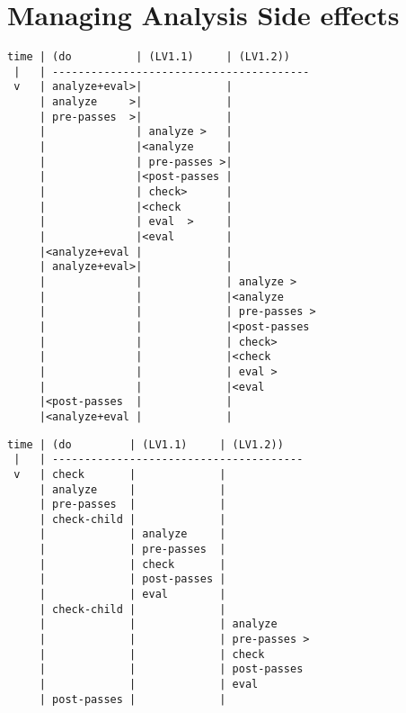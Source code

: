\chapter{Managing Analysis Side effects}

\begin{figure*}
\singlespacing
\begin{verbatim}
time | (do          | (LV1.1)     | (LV1.2))
 |   | ----------------------------------------
 v   | analyze+eval>|             |
     | analyze     >|             |
     | pre-passes  >|             |
     |              | analyze >   |
     |              |<analyze     |
     |              | pre-passes >|
     |              |<post-passes |
     |              | check>      |
     |              |<check       |
     |              | eval  >     |
     |              |<eval        |
     |<analyze+eval |             |
     | analyze+eval>|             |
     |              |             | analyze >   
     |              |             |<analyze     
     |              |             | pre-passes >
     |              |             |<post-passes 
     |              |             | check>      
     |              |             |<check       
     |              |             | eval >
     |              |             |<eval
     |<post-passes  |             |
     |<analyze+eval |             |
\end{verbatim}
  \caption{}
  \label{fig:analyzer:control-flow-pre-expand-side-effects}
\end{figure*}

\begin{figure*}
\singlespacing
\begin{verbatim}
time | (do         | (LV1.1)     | (LV1.2))
 |   | ---------------------------------------
 v   | check       |             |
     | analyze     |             |
     | pre-passes  |             |
     | check-child |             |
     |             | analyze     |
     |             | pre-passes  |
     |             | check       |
     |             | post-passes |
     |             | eval        |
     | check-child |             |
     |             |             | analyze
     |             |             | pre-passes >
     |             |             | check
     |             |             | post-passes
     |             |             | eval
     | post-passes |             |
\end{verbatim}
  \caption{}
  \label{fig:analyzer:control-flow-incremental-side-effects}
\end{figure*}
